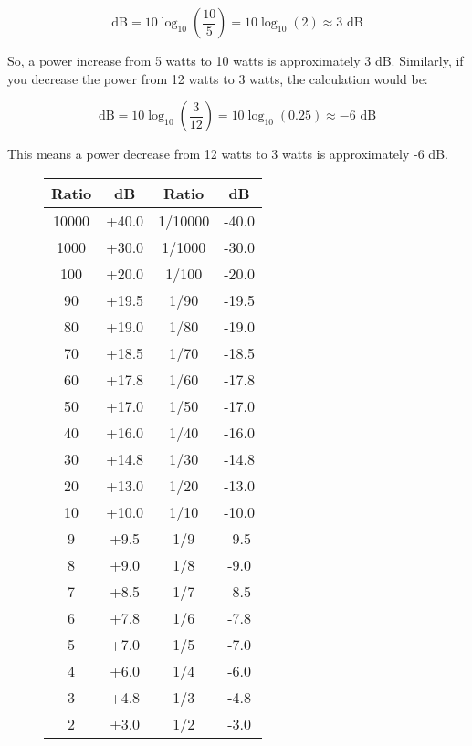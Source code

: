 \[
\text{dB} = 10 \log_{10}\left(\frac{10}{5}\right) = 10 \log_{10}(2) \approx 3 \text{ dB}
\]

So, a power increase from 5 watts to 10 watts is approximately 3 dB. Similarly, if you decrease the power from 12 watts to 3 watts, the calculation would be:

\[
\text{dB} = 10 \log_{10}\left(\frac{3}{12}\right) = 10 \log_{10}(0.25) \approx -6 \text{ dB}
\]

This means a power decrease from 12 watts to 3 watts is approximately -6 dB.

\begin{figure}[h]
    \centering
    \begin{minipage}{0.48\textwidth}
        \centering
        \scriptsize
        \begin{tabular}{|c|c||c|c|}
            \hline
            \textbf{Ratio} & \textbf{dB} & \textbf{Ratio} & \textbf{dB} \\
            \hline
            10000 & +40.0 & 1/10000 & -40.0 \\
            1000 & +30.0 & 1/1000 & -30.0 \\
            100 & +20.0 & 1/100 & -20.0 \\
            90 & +19.5 & 1/90 & -19.5 \\
            80 & +19.0 & 1/80 & -19.0 \\
            70 & +18.5 & 1/70 & -18.5 \\
            60 & +17.8 & 1/60 & -17.8 \\
            50 & +17.0 & 1/50 & -17.0 \\
            40 & +16.0 & 1/40 & -16.0 \\
            30 & +14.8 & 1/30 & -14.8 \\
            20 & +13.0 & 1/20 & -13.0 \\
            10 & +10.0 & 1/10 & -10.0 \\
            9 & +9.5 & 1/9 & -9.5 \\
            8 & +9.0 & 1/8 & -9.0 \\
            7 & +8.5 & 1/7 & -8.5 \\
            6 & +7.8 & 1/6 & -7.8 \\
            5 & +7.0 & 1/5 & -7.0 \\
            4 & +6.0 & 1/4 & -6.0 \\
            3 & +4.8 & 1/3 & -4.8 \\
            2 & +3.0 & 1/2 & -3.0 \\

\end{tabular}
\end{minipage}
\end{figure}
